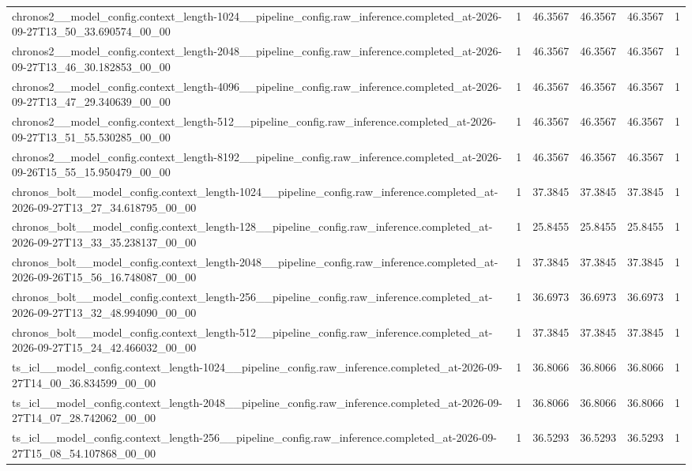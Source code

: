 \begin{tabular}{llllll}
chronos2\_\_model\_config.context\_length-1024\_\_pipeline\_config.raw\_inference.completed\_at-2026-09-27T13\_50\_33.690574\_00\_00 & 1 & 46.3567 & 46.3567 & 46.3567 & 1 \\
chronos2\_\_model\_config.context\_length-2048\_\_pipeline\_config.raw\_inference.completed\_at-2026-09-27T13\_46\_30.182853\_00\_00 & 1 & 46.3567 & 46.3567 & 46.3567 & 1 \\
chronos2\_\_model\_config.context\_length-4096\_\_pipeline\_config.raw\_inference.completed\_at-2026-09-27T13\_47\_29.340639\_00\_00 & 1 & 46.3567 & 46.3567 & 46.3567 & 1 \\
chronos2\_\_model\_config.context\_length-512\_\_pipeline\_config.raw\_inference.completed\_at-2026-09-27T13\_51\_55.530285\_00\_00 & 1 & 46.3567 & 46.3567 & 46.3567 & 1 \\
chronos2\_\_model\_config.context\_length-8192\_\_pipeline\_config.raw\_inference.completed\_at-2026-09-26T15\_55\_15.950479\_00\_00 & 1 & 46.3567 & 46.3567 & 46.3567 & 1 \\
chronos\_bolt\_\_model\_config.context\_length-1024\_\_pipeline\_config.raw\_inference.completed\_at-2026-09-27T13\_27\_34.618795\_00\_00 & 1 & 37.3845 & 37.3845 & 37.3845 & 1 \\
chronos\_bolt\_\_model\_config.context\_length-128\_\_pipeline\_config.raw\_inference.completed\_at-2026-09-27T13\_33\_35.238137\_00\_00 & 1 & 25.8455 & 25.8455 & 25.8455 & 1 \\
chronos\_bolt\_\_model\_config.context\_length-2048\_\_pipeline\_config.raw\_inference.completed\_at-2026-09-26T15\_56\_16.748087\_00\_00 & 1 & 37.3845 & 37.3845 & 37.3845 & 1 \\
chronos\_bolt\_\_model\_config.context\_length-256\_\_pipeline\_config.raw\_inference.completed\_at-2026-09-27T13\_32\_48.994090\_00\_00 & 1 & 36.6973 & 36.6973 & 36.6973 & 1 \\
chronos\_bolt\_\_model\_config.context\_length-512\_\_pipeline\_config.raw\_inference.completed\_at-2026-09-27T15\_24\_42.466032\_00\_00 & 1 & 37.3845 & 37.3845 & 37.3845 & 1 \\
ts\_icl\_\_model\_config.context\_length-1024\_\_pipeline\_config.raw\_inference.completed\_at-2026-09-27T14\_00\_36.834599\_00\_00 & 1 & 36.8066 & 36.8066 & 36.8066 & 1 \\
ts\_icl\_\_model\_config.context\_length-2048\_\_pipeline\_config.raw\_inference.completed\_at-2026-09-27T14\_07\_28.742062\_00\_00 & 1 & 36.8066 & 36.8066 & 36.8066 & 1 \\
ts\_icl\_\_model\_config.context\_length-256\_\_pipeline\_config.raw\_inference.completed\_at-2026-09-27T15\_08\_54.107868\_00\_00 & 1 & 36.5293 & 36.5293 & 36.5293 & 1 \\

\end{tabular}
